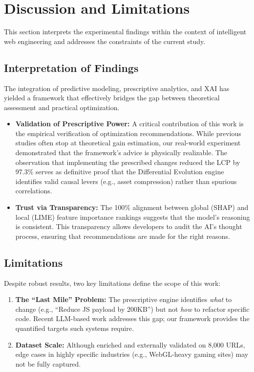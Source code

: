 \documentclass[conference]{IEEEtran}
\begin{document}
\section{Discussion and Limitations}

This section interprets the experimental findings within the context of intelligent web engineering and addresses the constraints of the current study.

\subsection{Interpretation of Findings}
The integration of predictive modeling, prescriptive analytics, and XAI has yielded a framework that effectively bridges the gap between theoretical assessment and practical optimization.
\begin{itemize}
    \item \textbf{Validation of Prescriptive Power:} A critical contribution of this work is the empirical verification of optimization recommendations. While previous studies often stop at theoretical gain estimation, our real-world experiment demonstrated that the framework's advice is physically realizable. The observation that implementing the prescribed changes reduced the LCP by 97.3\% serves as definitive proof that the Differential Evolution engine identifies valid causal levers (e.g., asset compression) rather than spurious correlations.
    \item \textbf{Trust via Transparency:} The 100\% alignment between global (SHAP) and local (LIME) feature importance rankings suggests that the model’s reasoning is consistent. This transparency allows developers to audit the AI's thought process, ensuring that recommendations are made for the right reasons.
\end{itemize}

\subsection{Limitations}
Despite robust results, two key limitations define the scope of this work:
\begin{enumerate}
    \item \textbf{The ``Last Mile'' Problem:} The prescriptive engine identifies \textit{what} to change (e.g., ``Reduce JS payload by 200KB'') but not \textit{how} to refactor specific code. Recent LLM-based work \cite{burg2026} addresses this gap; our framework provides the quantified targets such systems require.
    \item \textbf{Dataset Scale:} Although enriched and externally validated on 8,000 URLs, edge cases in highly specific industries (e.g., WebGL-heavy gaming sites) may not be fully captured.
\end{enumerate}
\end{document}
